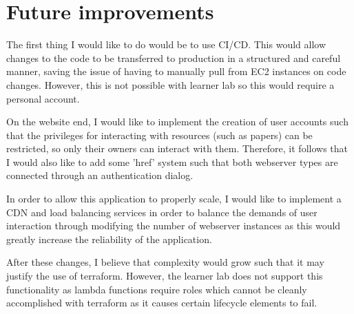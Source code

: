 \documentclass[12pt]{article}
\begin{document}
\section{Future improvements}

The first thing I would like to do would be to use CI/CD. This would allow changes to the code to be transferred to production in a structured and careful manner, saving the issue of having to manually pull from EC2 instances on code changes. However, this is not possible with learner lab so this would require a personal account.

On the website end, I would like to implement the creation of user accounts such that the privileges for interacting with resources (such as papers) can be restricted, so only their owners can interact with them. Therefore, it follows that I would also like to add some 'href' system such that both webserver types are connected through an authentication dialog. 

In order to allow this application to properly scale, I would like to implement a CDN and load balancing services in order to balance the demands of user interaction through modifying the number of webserver instances as this would greatly increase the reliability of the application. 

After these changes, I believe that complexity would grow such that it may justify the use of terraform. However, the learner lab does not support this functionality as lambda functions require roles which cannot be cleanly accomplished with terraform as it causes certain lifecycle elements to fail. 
\end{document}
